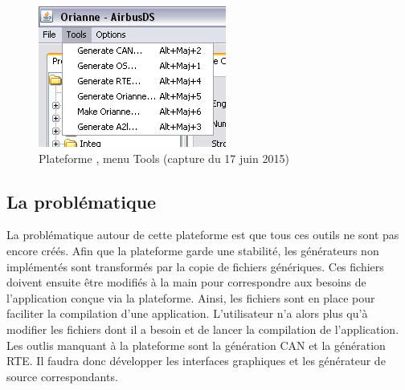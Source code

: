 \begin{figure}[h]
  \centering
  \includegraphics[scale=0.2]{images/toolsMenu}
  \caption{Plateforme , menu Tools (capture du 17 juin 2015)}
  \label{fig:plateforme}
\end{figure}

\subsection{La problématique}

La problématique autour de cette plateforme est que tous ces outils ne sont pas encore créés. Afin que la plateforme garde une stabilité, les générateurs non implémentés sont transformés par la copie de fichiers génériques. Ces fichiers doivent ensuite être modifiés à la main pour correspondre aux besoins de l'application conçue via la plateforme. Ainsi, les fichiers sont en place pour faciliter la compilation d'une application. L'utilisateur n'a alors plus qu'à modifier les fichiers dont il a besoin et de lancer la compilation de l'application.
Les outlis manquant à la plateforme sont la génération CAN et la génération RTE. Il faudra donc développer les interfaces graphiques et les générateur de source correspondants.